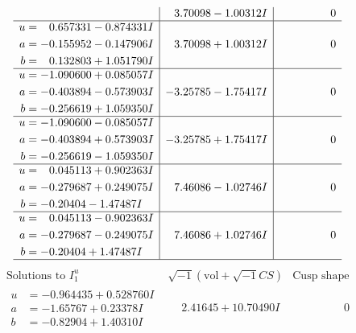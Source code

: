 \documentclass[1p]{elsarticle_modified}
\theoremstyle{definition}
\newcommand{\I}{\sqrt{-1}}
\begin{document}
$$\begin{array}{c|c|c}
 & \phantom{-}3.70098 - 1.00312 I & \phantom{-0.000000 } 0 \\ \hline\begin{aligned}
u &= \phantom{-}0.657331 - 0.874331 I \\
a &= -0.155952 - 0.147906 I \\
b &= \phantom{-}0.132803 + 1.051790 I\end{aligned}
 & \phantom{-}3.70098 + 1.00312 I & \phantom{-0.000000 } 0 \\ \hline\begin{aligned}
u &= -1.090600 + 0.085057 I \\
a &= -0.403894 - 0.573903 I \\
b &= -0.256619 + 1.059350 I\end{aligned}
 & -3.25785 - 1.75417 I & \phantom{-0.000000 } 0 \\ \hline\begin{aligned}
u &= -1.090600 - 0.085057 I \\
a &= -0.403894 + 0.573903 I \\
b &= -0.256619 - 1.059350 I\end{aligned}
 & -3.25785 + 1.75417 I & \phantom{-0.000000 } 0 \\ \hline\begin{aligned}
u &= \phantom{-}0.045113 + 0.902363 I \\
a &= -0.279687 + 0.249075 I \\
b &= -0.20404 - 1.47487 I\end{aligned}
 & \phantom{-}7.46086 - 1.02746 I & \phantom{-0.000000 } 0 \\ \hline\begin{aligned}
u &= \phantom{-}0.045113 - 0.902363 I \\
a &= -0.279687 - 0.249075 I \\
b &= -0.20404 + 1.47487 I\end{aligned}
 & \phantom{-}7.46086 + 1.02746 I & \phantom{-0.000000 } 0\\
 \hline 
 \end{array}$$\newpage$$\begin{array}{c|c|c}  
\text{Solutions to }I^u_{1}& \I (\text{vol} + \sqrt{-1}CS) & \text{Cusp shape}\\
 \hline 
\begin{aligned}
u &= -0.964435 + 0.528760 I \\
a &= -1.65767 + 0.23378 I \\
b &= -0.82904 + 1.40310 I\end{aligned}
 & \phantom{-}2.41645 + 10.70490 I & \phantom{-0.000000 } 0 \\ \hline\begin{aligned}

\end{aligned}
\end{array}$$
\end{document}
